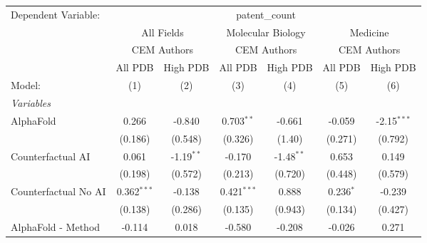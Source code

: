 \begingroup
\centering
\begin{tabular}{lcccccc}
   \tabularnewline \midrule \midrule
   Dependent Variable: & \multicolumn{6}{c}{patent\_count}\\
 & \multicolumn{2}{c}{All Fields} & \multicolumn{2}{c}{Molecular Biology} & \multicolumn{2}{c}{Medicine} \\
\cmidrule(lr){2-3} \cmidrule(lr){4-5} \cmidrule(lr){6-7}
 & \multicolumn{2}{c}{CEM Authors} & \multicolumn{2}{c}{CEM Authors} & \multicolumn{2}{c}{CEM Authors} \\
\cmidrule(lr){2-3} \cmidrule(lr){4-5} \cmidrule(lr){6-7}
 & \multicolumn{1}{c}{All PDB} & \multicolumn{1}{c}{High PDB} & \multicolumn{1}{c}{All PDB} & \multicolumn{1}{c}{High PDB} & \multicolumn{1}{c}{All PDB} & \multicolumn{1}{c}{High PDB} \\
\cmidrule(lr){2-2} \cmidrule(lr){3-3} \cmidrule(lr){4-4} \cmidrule(lr){5-5} \cmidrule(lr){6-6} \cmidrule(lr){7-7}
   Model:                                                     & (1)           & (2)           & (3)           & (4)           & (5)          & (6)\\  
   \midrule
   \emph{Variables}\\
   AlphaFold                                                  & 0.266         & -0.840        & 0.703$^{**}$  & -0.661        & -0.059       & -2.15$^{***}$\\   
                                                              & (0.186)       & (0.548)       & (0.326)       & (1.40)        & (0.271)      & (0.792)\\   
   Counterfactual AI                                          & 0.061         & -1.19$^{**}$  & -0.170        & -1.48$^{**}$  & 0.653        & 0.149\\   
                                                              & (0.198)       & (0.572)       & (0.213)       & (0.720)       & (0.448)      & (0.579)\\   
   Counterfactual No AI                                       & 0.362$^{***}$ & -0.138        & 0.421$^{***}$ & 0.888         & 0.236$^{*}$  & -0.239\\   
                                                              & (0.138)       & (0.286)       & (0.135)       & (0.943)       & (0.134)      & (0.427)\\   
   AlphaFold - Method                                         & -0.114        & 0.018         & -0.580        & -0.208        & -0.026       & 0.271\\   

\end{tabular}
